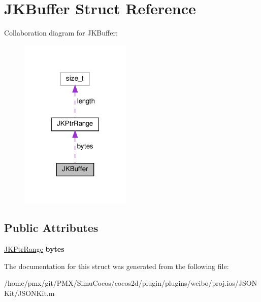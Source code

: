 \hypertarget{structJKBuffer}{}\section{J\+K\+Buffer Struct Reference}
\label{structJKBuffer}


Collaboration diagram for J\+K\+Buffer\+:
\nopagebreak
\begin{figure}[H]
\begin{center}
\leavevmode
\includegraphics[width=150pt]{structJKBuffer__coll__graph}
\end{center}
\end{figure}
\subsection*{Public Attributes}
\begin{DoxyCompactItemize}
\item 
\mbox{\label{structJKBuffer_a82b694da8e8cc43e460b548581b1dc03}} 
\hyperlink{structJKPtrRange}{J\+K\+Ptr\+Range} {\bfseries bytes}
\end{DoxyCompactItemize}


The documentation for this struct was generated from the following file\+:\begin{DoxyCompactItemize}
\item 
/home/pmx/git/\+P\+M\+X/\+Simu\+Cocos/cocos2d/plugin/plugins/weibo/proj.\+ios/\+J\+S\+O\+N\+Kit/J\+S\+O\+N\+Kit.\+m\end{DoxyCompactItemize}

